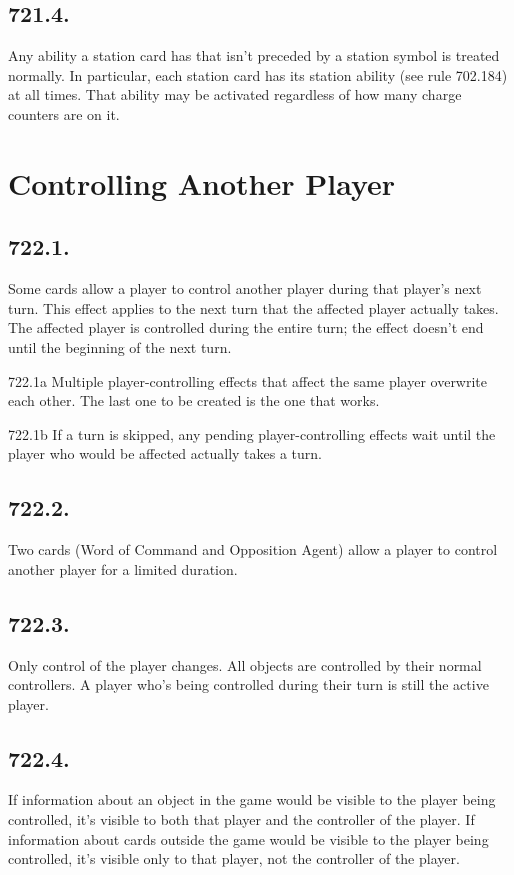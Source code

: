 \subsection*{721.4.}
Any ability a station card has that isn’t preceded by a station symbol is treated normally. In particular, each station card has its station ability (see rule 702.184) at all times. That ability may be activated regardless of how many charge counters are on it.

\section{Controlling Another Player}
\subsection*{722.1.}
Some cards allow a player to control another player during that player’s next turn. This effect applies to the next turn that the affected player actually takes. The affected player is controlled during the entire turn; the effect doesn’t end until the beginning of the next turn.

722.1a Multiple player-controlling effects that affect the same player overwrite each other. The last one to be created is the one that works.

722.1b If a turn is skipped, any pending player-controlling effects wait until the player who would be affected actually takes a turn.

\subsection*{722.2.}
Two cards (Word of Command and Opposition Agent) allow a player to control another player for a limited duration.

\subsection*{722.3.}
Only control of the player changes. All objects are controlled by their normal controllers. A player who’s being controlled during their turn is still the active player.

\subsection*{722.4.}
If information about an object in the game would be visible to the player being controlled, it’s visible to both that player and the controller of the player. If information about cards outside the game would be visible to the player being controlled, it’s visible only to that player, not the controller of the player.

